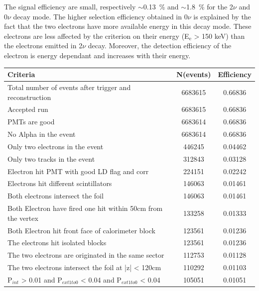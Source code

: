 \documentclass[main.tex]{subfiles}
\begin{document}
\NI The signal efficiency are small, respectively $\sim$0.13~\% and $\sim$1.8~\% for the 2$\nu$ and 0$\nu$ decay mode. The higher selection efficiency obtained in 0$\nu$ is explained by the fact that the two electrons have more available energy in this decay mode. These electrons are less affected by the criterion on their energy (E$_\text{e}$ > 150 keV) than the electrons emitted in 2$\nu$ decay. Moreover, the detection efficiency of the electron is energy dependant and increases with their energy. 



\ifx
\begin{table}[h!]
\begin{center}
\begin{tabular}{l|c|c}
                                                            Criteria   &  N(events)     &  Efficiency \\
\toprule
               Total number of events after trigger and reconstruction  &    6683615    &     0.66836\\
                                                          Accepted run  &    6683615    &     0.66836\\
                                                         PMTs are good  &    6683614    &     0.66836\\
                                                 No Alpha in the event  &    6683614    &     0.66836\\
                                       Only two electrons in the event  &     446245    &     0.04462\\
                                          Only two tracks in the event  &     312843    &     0.03128\\
                           Electron hit PMT with good LD flag and corr  &     224151    &     0.02242\\
                                 Electrons hit different scintillators  &     146063    &     0.01461\\
                                     Both electrons intersect the foil  &     146063    &     0.01461\\
          Both Electron have fired one hit within 50cm from the vertex  &     133258    &     0.01333\\
                     Both Electron hit front face of calorimeter block  &     123561    &     0.01236\\
                                     The electrons hit isolated blocks  &     123561    &     0.01236\\
                   The two electrons are originated in the same sector  &     112753    &     0.01128\\
                   The two electrons intersect the foil at |z| < 120cm  &     110292    &     0.01103\\
P$_{int}$ > 0.01 and P$_{ext1 to 0}$ < 0.04 and P$_{ext1 to 0}$ < 0.04  &     105051    &     0.01051\\


\end{tabular}
\end{center}
\end{table}
\end{document}
